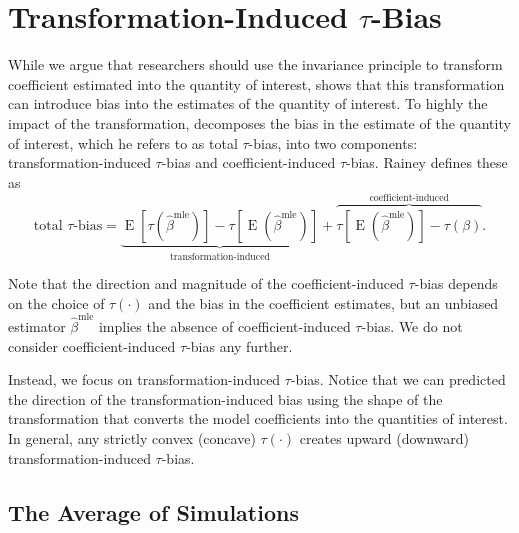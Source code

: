 \documentclass[11pt]{article}
\DeclareMathOperator*{\E}{\text{E}}
\begin{document}
\section*{Transformation-Induced $\tau$-Bias}

While we argue that researchers should use the invariance principle to transform coefficient estimated into the quantity of interest, \cite{Rainey2017} shows that this transformation can introduce bias into the estimates of the quantity of interest.
To highly the impact of the transformation, \citet[p. 404]{Rainey2017} decomposes the bias in the estimate of the quantity of interest, which he refers to as total $\tau$-bias, into two components: transformation-induced $\tau$-bias and coefficient-induced $\tau$-bias. 
Rainey defines these as
\begin{equation}
\text{total } \tau\text{-bias}= \underbrace{ \E[\tau(\hat{\beta}^\text{mle})]-  \tau[\E(\hat{\beta}^\text{mle})]  }_{\text{transformation-induced}} + \overbrace{  \tau[\E(\hat{\beta}^\text{mle})] - \tau(\beta)  }^{\text{coefficient-induced}}\text{.} \label{eqn:ti-bias}
\end{equation}

Note that the direction and magnitude of the coefficient-induced $\tau$-bias depends on the choice of $\tau(\cdot)$ and the bias in the coefficient estimates, but an unbiased estimator $\hat{\beta}^\text{mle}$ implies the absence of coefficient-induced $\tau$-bias. 
We do not consider coefficient-induced $\tau$-bias any further.

Instead, we focus on transformation-induced $\tau$-bias.
Notice that we can predicted the direction of the transformation-induced bias using the shape of the transformation that converts the model coefficients into the quantities of interest.
In general, any strictly convex (concave) $\tau(\cdot)$ creates upward (downward) transformation-induced $\tau$-bias.

\subsection*{The Average of Simulations}
\end{document}
